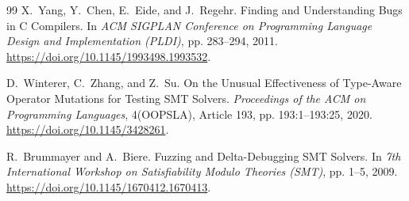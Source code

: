 \documentclass[version=preprint]{iacrcc}
\theoremstyle{definition}
\theoremstyle{remark}
\begin{document}
\begin{thebibliography}{99}
	X.~Yang, Y.~Chen, E.~Eide, and J.~Regehr.
	\newblock Finding and Understanding Bugs in C Compilers.
	\newblock In \emph{ACM SIGPLAN Conference on Programming Language Design and
		Implementation (PLDI)}, pp. 283--294, 2011.
	\newblock \url{https://doi.org/10.1145/1993498.1993532}.

	D.~Winterer, C.~Zhang, and Z.~Su.
	\newblock On the Unusual Effectiveness of Type-Aware Operator Mutations for
	Testing SMT Solvers.
	\newblock \emph{Proceedings of the ACM on Programming Languages}, 4(OOPSLA),
	Article 193, pp. 193:1--193:25, 2020.
	\newblock \url{https://doi.org/10.1145/3428261}.

	R.~Brummayer and A.~Biere.
	\newblock Fuzzing and Delta-Debugging SMT Solvers.
	\newblock In \emph{7th International Workshop on Satisfiability Modulo Theories
		(SMT)}, pp. 1--5, 2009.
	\newblock \url{https://doi.org/10.1145/1670412.1670413}.

\end{thebibliography}
\end{document}
